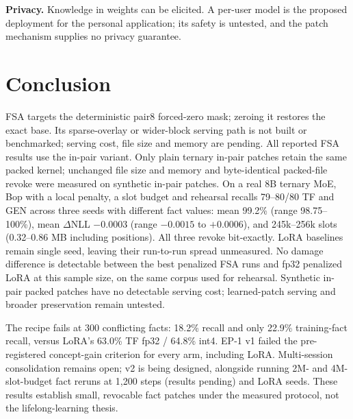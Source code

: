 \documentclass[11pt]{article}
\begin{document}
\textbf{Privacy.} Knowledge in weights can be elicited. A per-user model is the proposed deployment for the personal application; its safety is untested, and
the patch mechanism supplies no privacy guarantee.

\section{Conclusion}
FSA targets the deterministic pair8 forced-zero mask; zeroing it restores the exact base. Its
sparse-overlay or wider-block serving path is not built or benchmarked; serving cost, file size
and memory are pending. All reported FSA results use the in-pair variant. Only plain
ternary in-pair patches retain the same packed kernel; unchanged file size and memory and
byte-identical packed-file revoke were measured on synthetic in-pair patches. On a real 8B ternary
MoE, Bop with a local penalty, a slot budget and rehearsal recalls 79--80/80 TF and GEN across three
seeds with different fact values: mean 99.2\% (range 98.75--100\%), mean $\Delta$NLL $-0.0003$ (range $-0.0015$ to
$+0.0006$), and 245k--256k slots (0.32--0.86 MB including positions). All three revoke bit-exactly.
LoRA baselines remain single seed, leaving their run-to-run spread unmeasured. No damage difference
is detectable between the best penalized FSA runs and fp32 penalized LoRA at this sample size,
on the same corpus used for rehearsal. Synthetic in-pair packed patches have no detectable serving cost;
learned-patch serving and broader preservation remain untested.

The recipe fails at 300 conflicting facts: 18.2\% recall and only 22.9\% training-fact recall,
versus LoRA's 63.0\% TF fp32 / 64.8\% int4. EP-1 v1 failed the pre-registered concept-gain
criterion for every arm, including LoRA. Multi-session consolidation remains open; v2 is being
designed, alongside running 2M- and 4M-slot-budget fact reruns at 1,200 steps (results pending) and LoRA seeds. These results establish small,
revocable fact patches under the measured protocol, not the lifelong-learning thesis.

\small
\setlength{\bibsep}{0pt}


\end{document}
